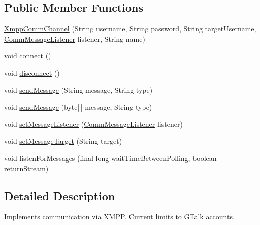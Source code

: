 \subsection*{Public Member Functions}
\begin{DoxyCompactItemize}
\item 
\hyperlink{classcom_1_1cellbots_1_1communication_1_1_xmpp_comm_channel_a8288919f54e546a272ba78612f6a6959}{Xmpp\-Comm\-Channel} (String username, String password, String target\-Username, \hyperlink{interfacecom_1_1cellbots_1_1communication_1_1_abstract_comm_channel_1_1_comm_message_listener}{Comm\-Message\-Listener} listener, String name)
\item 
void \hyperlink{classcom_1_1cellbots_1_1communication_1_1_xmpp_comm_channel_ad250779dd466c0a5b3a594dcd1aa0775}{connect} ()
\item 
void \hyperlink{classcom_1_1cellbots_1_1communication_1_1_xmpp_comm_channel_a6efdff8853f69895c8e11dbea95d2db4}{disconnect} ()
\item 
void \hyperlink{classcom_1_1cellbots_1_1communication_1_1_xmpp_comm_channel_a9af3bc4e9336edb4cd78a1197c271968}{send\-Message} (String message, String type)
\item 
void \hyperlink{classcom_1_1cellbots_1_1communication_1_1_xmpp_comm_channel_a075c71117a2e2d647a695fee2d2b73a5}{send\-Message} (byte\mbox{[}$\,$\mbox{]} message, String type)
\item 
void \hyperlink{classcom_1_1cellbots_1_1communication_1_1_xmpp_comm_channel_a240c6ddd444d89f51b0d4756826e20e6}{set\-Message\-Listener} (\hyperlink{interfacecom_1_1cellbots_1_1communication_1_1_abstract_comm_channel_1_1_comm_message_listener}{Comm\-Message\-Listener} listener)
\item 
void \hyperlink{classcom_1_1cellbots_1_1communication_1_1_xmpp_comm_channel_a0c121157e7eb1113e2d9a1ce26f9974b}{set\-Message\-Target} (String target)
\item 
void \hyperlink{classcom_1_1cellbots_1_1communication_1_1_xmpp_comm_channel_a0e13be6453d99e853ef3f6081462522a}{listen\-For\-Messages} (final long wait\-Time\-Between\-Polling, boolean return\-Stream)
\end{DoxyCompactItemize}


\subsection{Detailed Description}
Implements communication via X\-M\-P\-P. Current limits to G\-Talk accounts.

